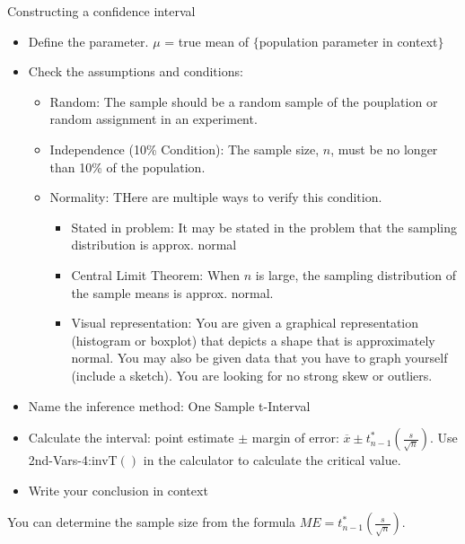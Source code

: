 \documentclass[../stats.tex]{subfiles}
\begin{document}
Constructing a confidence interval
\begin{itemize}
    \item Define the parameter. $\mu$ = true mean of $\{$population parameter in context$\}$
    \item Check the assumptions and conditions: 
    \begin{itemize}
        \item Random: The sample should be a random sample of the pouplation or random assignment in an experiment.
        \item Independence (10\% Condition): The sample size, $n$, must be no longer than 10\% of the population.
        \item Normality: THere are multiple ways to verify this condition.
        \begin{itemize}
            \item Stated in problem: It may be stated in the problem that the sampling distribution is approx. normal 
            \item Central Limit Theorem: When $n$ is large, the sampling distribution of the sample means is approx. normal.
            \item Visual representation: You are given a graphical representation (histogram or boxplot) that depicts a shape that is approximately normal. You may also be given data that you have to graph yourself (include a sketch). You are looking for no strong skew or outliers. 
        \end{itemize}
        \end{itemize}
    \item Name the inference method: One Sample t-Interval 
    \item Calculate the interval: point estimate $\pm$ margin of error: $\overline{x}\pm t^*_{n-1}\left(\frac{s}{\sqrt{n}}\right)$. Use 2nd-Vars-4:invT$()$ in the calculator to calculate the critical value.
    \item Write your conclusion in context
\end{itemize}
You can determine the sample size from the formula $ME=t^*_{n-1}\left(\frac{s}{\sqrt{n}}\right)$.
\end{document}
